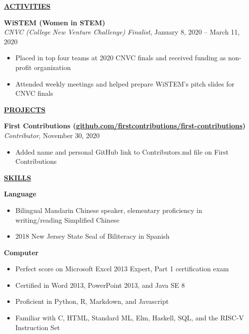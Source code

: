 \documentclass[
]{article}
\providecommand{\tightlist}{%
  \setlength{\itemsep}{0pt}\setlength{\parskip}{0pt}}
\begin{document}
\textbf{\underline{ACTIVITIES}}

\textbf{WiSTEM (Women in STEM)}\\
\emph{CNVC (College New Venture Challenge) Finalist}, January 8, 2020 --
March 11, 2020

\begin{itemize}
\tightlist
\item
  Placed in top four teams at 2020 CNVC finals and received funding as
  non-profit organization
\end{itemize}

\begin{itemize}
\tightlist
\item
  Attended weekly meetings and helped prepare WiSTEM's pitch slides for
  CNVC finals
\end{itemize}

\textbf{\underline{PROJECTS}}

\textbf{First Contributions
(\href{https://www.github.com/firstcontributions/first-contributions}{github.com/firstcontributions/first-contributions})}\\
\emph{Contributor}, November 30, 2020

\begin{itemize}
\tightlist
\item
  Added name and personal GitHub link to Contributors.md file on First
  Contributions
\end{itemize}

\textbf{\underline{SKILLS}}

\textbf{Language}

\begin{itemize}
\item
  Bilingual Mandarin Chinese speaker, elementary proficiency in
  writing/reading Simplified Chinese
\item
  2018 New Jersey State Seal of Biliteracy in Spanish
\end{itemize}

\textbf{Computer}

\begin{itemize}
\item
  Perfect score on Microsoft Excel 2013 Expert, Part 1 certification
  exam
\item
  Certified in Word 2013, PowerPoint 2013, and Java SE 8
\end{itemize}

\begin{itemize}
\item
  Proficient in Python, R, Markdown, and Javascript
\item
  Familiar with C, HTML, Standard ML, Elm, Haskell, SQL, and the RISC-V
  Instruction Set
\end{itemize}
\end{document}

